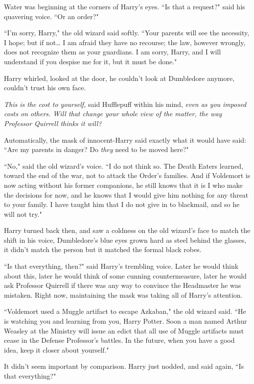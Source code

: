 Water was beginning at the corners of Harry's eyes. ``Is that a request?" said his quavering voice. ``Or an order?"

``I'm sorry, Harry," the old wizard said softly. ``Your parents will see the necessity, I hope; but if not{\ldots} I am afraid they have no recourse; the law, however wrongly, does not recognize them as your guardians. I am sorry, Harry, and I will understand if you despise me for it, but it must be done."

Harry whirled, looked at the door, he couldn't look at Dumbledore anymore, couldn't trust his own face.

\emph{This is the cost to yourself,} said Hufflepuff within his mind, \emph{even as you imposed costs on others. Will that change your whole view of the matter, the way Professor Quirrell thinks it will?}

Automatically, the mask of innocent-Harry said exactly what it would have said: ``Are my parents in danger? Do \emph{they} need to be moved here?"

``No," said the old wizard's voice. ``I do not think so. The Death Eaters learned, toward the end of the war, not to attack the Order's families. And if Voldemort is now acting without his former companions, he still knows that it is I who make the decisions for now, and he knows that I would give him nothing for any threat to your family. I have taught him that I do not give in to blackmail, and so he will not try."

Harry turned back then, and saw a coldness on the old wizard's face to match the shift in his voice, Dumbledore's blue eyes grown hard as steel behind the glasses, it didn't match the person but it matched the formal black robes.

``Is that everything, then?" said Harry's trembling voice. Later he would think about this, later he would think of some cunning countermeasure, later he would ask Professor Quirrell if there was any way to convince the Headmaster he was mistaken. Right now, maintaining the mask was taking all of Harry's attention.

``Voldemort used a Muggle artifact to escape Azkaban," the old wizard said. ``He is watching you and learning from you, Harry Potter. Soon a man named Arthur Weasley at the Ministry will issue an edict that all use of Muggle artifacts must cease in the Defense Professor's battles. In the future, when you have a good idea, keep it closer about yourself."

It didn't seem important by comparison. Harry just nodded, and said again, ``Is that everything?"

